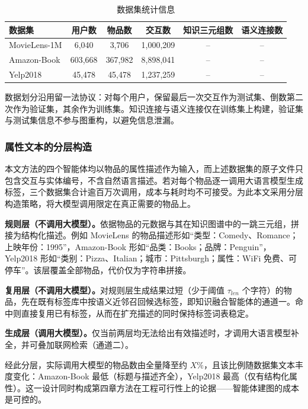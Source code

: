 \begin{table}[htbp]
  \centering
  \caption{数据集统计信息}
  \label{tab:graph-dataset}
  \small
  \begin{tabular}{lccccc}
    \toprule
    数据集 & 用户数 & 物品数 & 交互数 & 知识三元组数 & 语义连接数 \\
    \midrule
    MovieLens-1M   & 6,040 & 3,706 & 1,000,209 & -- & -- \\
    Amazon-Book   & 603,668 & 367,982 & 8,898,041 & -- & -- \\
    Yelp2018      & 45,478 & 45,478 & 1,237,259 & -- & -- \\
    \bottomrule
  \end{tabular}
\end{table}


数据划分沿用留一法协议：对每个用户，保留最后一次交互作为测试集、倒数第二次作为验证集，其余作为训练集。知识连接与语义连接仅在训练集上构建，验证集与测试集信息不参与图重构，以避免信息泄漏。

\subsubsection{属性文本的分层构造}
\label{subsubsec:attr-text}

本文方法的四个智能体均以物品的属性描述作为输入，而上述数据集的原子文件只包含交互与实体编号，不含自然语言描述。若对每个物品逐一调用大语言模型生成标签，三个数据集合计逾百万次调用，成本与耗时均不可接受。为此本文采用分层构造策略，将大模型调用限定在真正需要的物品上。

\textbf{规则层（不调用大模型）。}依据物品的元数据与其在知识图谱中的一跳三元组，拼接为结构化描述。例如 MovieLens 的物品描述形如“类型：Comedy、Romance；上映年份：1995”，Amazon-Book 形如“品类：Books；品牌：Penguin”，Yelp2018 形如“类别：Pizza、Italian；城市：Pittsburgh；属性：WiFi 免费、可停车”。该层覆盖全部物品，代价仅为字符串拼接。

\textbf{复用层（不调用大模型）。}对规则层生成结果过短（少于阈值 $\tau_{len}$ 个字符）的物品，先在既有标签库中按语义近邻召回候选标签，即知识融合智能体的通道一。命中则直接复用已有标签，从而在扩充描述的同时保持标签词表稳定。

\textbf{生成层（调用大模型）。}仅当前两层均无法给出有效描述时，才调用大语言模型补全，并可叠加联网检索（通道二）。

经此分层，实际调用大模型的物品数由全量降至约 $X\%$，且该比例随数据集文本丰度变化：Amazon-Book 最低（标题与描述齐全），Yelp2018 最高（仅有结构化属性）。这一设计同时构成第四章方法在工程可行性上的论据——智能体建图的成本是可控的。

